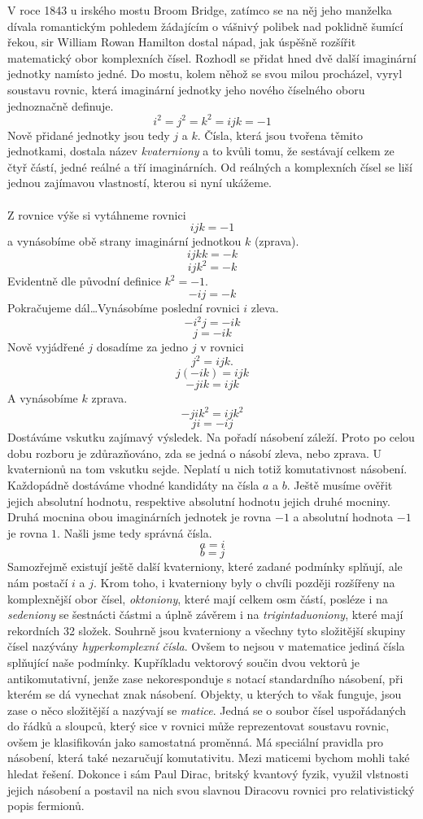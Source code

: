 \documentclass{../../../../style/mkimain}
\begin{document}
\noindent{}
\klein
V roce 1843 u irského mostu Broom Bridge,
zatímco se na něj jeho manželka dívala romantickým pohledem žádajícím o vášnivý polibek nad poklidně šumící řekou,
sir William Rowan Hamilton dostal nápad, jak úspěšně rozšířit matematický obor komplexních čísel.
Rozhodl se přidat hned dvě další imaginární jednotky namísto jedné. Do mostu, kolem něhož se svou milou procházel,
vyryl soustavu rovnic, která imaginární jednotky jeho nového číselného oboru jednoznačně definuje.
$$i^2=j^2=k^2=ijk=-1$$
Nově přidané jednotky jsou tedy $j$ a $k$. Čísla, která jsou tvořena těmito jednotkami, dostala název \emph{kvaterniony} a to kvůli tomu,
že sestávají celkem ze čtyř částí, jedné reálné a tří imaginárních. Od reálných a komplexních čísel se liší jednou zajímavou vlastností, kterou si nyní ukážeme.
\\
\\
Z rovnice výše si vytáhneme rovnici
$$ijk=-1$$
a vynásobíme obě strany imaginární jednotkou $k$ (zprava).
$$ijkk=-k$$
$$ijk^2=-k$$
Evidentně dle původní definice $k^2=-1$.
$$-ij=-k$$
Pokračujeme dál\dots Vynásobíme poslední rovnici $i$ zleva.
$$-i^2j=-ik$$
$$j=-ik$$
Nově vyjádřené $j$ dosadíme za jedno $j$ v rovnici
$$j^2=ijk\text{.}$$
$$j(-ik)=ijk$$
$$-jik=ijk$$
A vynásobíme $k$ zprava.
$$-jik^2=ijk^2$$
$$ji=-ij$$
Dostáváme vskutku zajímavý výsledek. Na pořadí násobení záleží. Proto po celou dobu rozboru je zdůrazňováno, zda se jedná o násobí zleva, nebo zprava.
U kvaternionů na tom vskutku sejde. Neplatí u nich totiž komutativnost násobení. Každopádně dostáváme vhodné kandidáty na čísla $a$ a $b$.
Ještě musíme ověřit jejich absolutní hodnotu, respektive absolutní hodnotu jejich druhé mocniny. Druhá mocnina obou imaginárních jednotek je rovna $-1$ a absolutní hodnota $-1$ je rovna $1$.
Našli jsme tedy správná čísla.
$$a=i$$
$$b=j$$
Samozřejmě existují ještě další kvaterniony, které zadané podmínky splňují, ale nám postačí $i$ a $j$. Krom toho, i kvaterniony byly o chvíli později rozšířeny na komplexnější obor čísel, \emph{oktoniony},
které mají celkem osm částí, posléze i na \emph{sedeniony} se šestnácti částmi a úplně závěrem i na \emph{trigintaduoniony}, které mají rekordních 32 složek. Souhrně jsou kvaterniony a všechny tyto složitější skupiny čísel
nazývány \emph{hyperkomplexní čísla}. Ovšem to nejsou v matematice jediná čísla splňující naše podmínky. Kupříkladu vektorový součin dvou vektorů je antikomutativní, jenže zase nekoresponduje s notací standardního násobení,
při kterém se dá vynechat znak násobení. Objekty, u kterých to však funguje, jsou zase o něco složitější a nazývají se \emph{matice}.
Jedná se o soubor čísel uspořádaných do řádků a sloupců, který sice v rovnici může reprezentovat soustavu rovnic, ovšem je klasifikován jako samostatná proměnná. Má speciální pravidla pro násobení, která také nezaručují komutativitu.
Mezi maticemi bychom mohli také hledat řešení. Dokonce i sám Paul Dirac, britský kvantový fyzik, využil vlstnosti jejich násobení a postavil na nich svou slavnou Diracovu rovnici pro relativistický popis fermionů.
\end{document}
